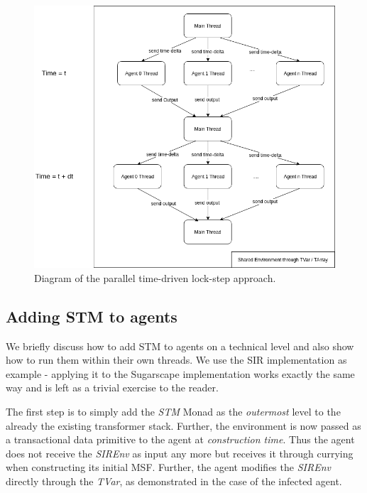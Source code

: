 \begin{figure}
	\centering
	\includegraphics[width=1.0\textwidth, angle=0]{./fig/concurrentabs/stm_abs.png}
	\caption{Diagram of the parallel time-driven lock-step approach.}
	\label{fig:stm_abs_structure}
\end{figure}

\subsection{Adding STM to agents}
We briefly discuss how to add STM to agents on a technical level and also show how to run them within their own threads. We use the SIR implementation as example - applying it to the Sugarscape implementation works exactly the same way and is left as a trivial exercise to the reader.

The first step is to simply add the \textit{STM} Monad as the \textit{outermost} level to the already the existing transformer stack. Further, the environment is now passed as a transactional data primitive to the agent at \textit{construction time}. Thus the agent does not receive the \textit{SIREnv} as input any more but receives it through currying when constructing its initial MSF. Further, the agent modifies the \textit{SIREnv} directly through the \textit{TVar}, as demonstrated in the case of the infected agent.

